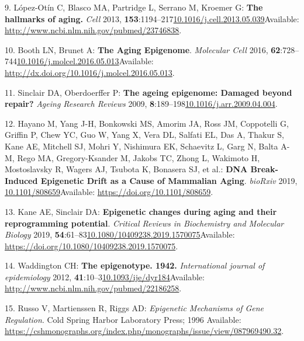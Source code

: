 \documentclass[
]{book}
\begin{document}
\leavevmode\hypertarget{ref-Lopez-Otin2013}{}%
9. López-Otín C, Blasco MA, Partridge L, Serrano M, Kroemer G: \textbf{The hallmarks of aging.} \emph{Cell} 2013, \textbf{153}:1194--217\href{https://doi.org/10.1016/j.cell.2013.05.039}{10.1016/j.cell.2013.05.039}Available: \url{http://www.ncbi.nlm.nih.gov/pubmed/23746838}.

\leavevmode\hypertarget{ref-Booth2016}{}%
10. Booth LN, Brunet A: \textbf{The Aging Epigenome}. \emph{Molecular Cell} 2016, \textbf{62}:728--744\href{https://doi.org/10.1016/j.molcel.2016.05.013}{10.1016/j.molcel.2016.05.013}Available: \url{http://dx.doi.org/10.1016/j.molcel.2016.05.013}.

\leavevmode\hypertarget{ref-Sinclair2009}{}%
11. Sinclair DA, Oberdoerffer P: \textbf{The ageing epigenome: Damaged beyond repair?} \emph{Ageing Research Reviews} 2009, \textbf{8}:189--198\href{https://doi.org/10.1016/j.arr.2009.04.004}{10.1016/j.arr.2009.04.004}.

\leavevmode\hypertarget{ref-Hayano2019}{}%
12. Hayano M, Yang J-H, Bonkowski MS, Amorim JA, Ross JM, Coppotelli G, Griffin P, Chew YC, Guo W, Yang X, Vera DL, Salfati EL, Das A, Thakur S, Kane AE, Mitchell SJ, Mohri Y, Nishimura EK, Schaevitz L, Garg N, Balta A-M, Rego MA, Gregory-Ksander M, Jakobs TC, Zhong L, Wakimoto H, Mostoslavsky R, Wagers AJ, Tsubota K, Bonasera SJ, et al.: \textbf{DNA Break-Induced Epigenetic Drift as a Cause of Mammalian Aging}. \emph{bioRxiv} 2019, \href{https://doi.org/10.1101/808659}{10.1101/808659}Available: \url{https://doi.org/10.1101/808659}.

\leavevmode\hypertarget{ref-Kane2019}{}%
13. Kane AE, Sinclair DA: \textbf{Epigenetic changes during aging and their reprogramming potential}. \emph{Critical Reviews in Biochemistry and Molecular Biology} 2019, \textbf{54}:61--83\href{https://doi.org/10.1080/10409238.2019.1570075}{10.1080/10409238.2019.1570075}Available: \url{https://doi.org/10.1080/10409238.2019.1570075}.

\leavevmode\hypertarget{ref-Waddington1942}{}%
14. Waddington CH: \textbf{The epigenotype. 1942.} \emph{International journal of epidemiology} 2012, \textbf{41}:10--3\href{https://doi.org/10.1093/ije/dyr184}{10.1093/ije/dyr184}Available: \url{http://www.ncbi.nlm.nih.gov/pubmed/22186258}.

\leavevmode\hypertarget{ref-Russo1996}{}%
15. Russo V, Martienssen R, Riggs AD: \emph{Epigenetic Mechanisms of Gene Regulation}. Cold Spring Harbor Laboratory Press; 1996 Available: \url{https://cshmonographs.org/index.php/monographs/issue/view/087969490.32}.
\end{document}
